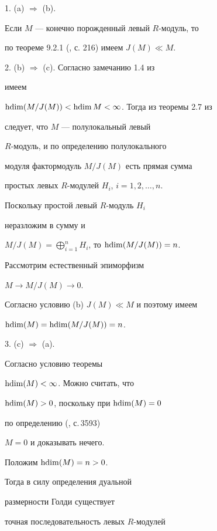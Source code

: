 \begin{pf} 


1. (a) $\Rightarrow$ (b).


Если $M$ --- конечно порожденный левый $R$-модуль, то 


по теореме 9.2.1 (\cite{kasch}, с. 216) имеем $J(M) \ll M$.





2. (b) $\Rightarrow$ (c). Согласно замечанию 1.4 из


\cite{lomp99} имеем 


$\operatorname{hdim}(M/J(M))<\operatorname{hdim} M< \infty $. Тогда из теоремы 2.7 из


\cite{lomp99} следует, что $M$ --- полулокальный левый 


$R$-модуль, и по определению полулокального 


модуля фактормодуль $M/J(M)$ есть прямая сумма 


простых левых $R$-модулей $H_i$, $i=1,2,\dotsc,n$.


Поскольку простой левый $R$-модуль $H_i$ 


неразложим в сумму и 


$M/J(M) = \bigoplus_{i=1}^n H_i $, то $\operatorname{hdim}(M/J(M))=n$.


Рассмотрим естественный эпиморфизм 


$M \rightarrow M/J(M) \rightarrow 0$.


Согласно условию (b) $J(M) \ll M$ и поэтому имеем 


$\operatorname{hdim} (M)=\operatorname{hdim} (M/J(M))=n$.





3. (c) $\Rightarrow$ (a).


Согласно условию теоремы 


$\operatorname{hdim} (M) < \infty$. Можно считать, что 


$\operatorname{hdim} (M) > 0$, поскольку при $\operatorname{hdim} (M)=0$


по определению (\cite{herbera}, с.\,3593) 


$M=0$ и доказывать нечего.


Положим $\operatorname{hdim} (M)=n>0$. 


Тогда в силу определения дуальной 


размерности Голди существует 


точная последовательность левых $R$-модулей 


\begin{equation} \label{Metka1} 



\end{equation}
\end{pf}
